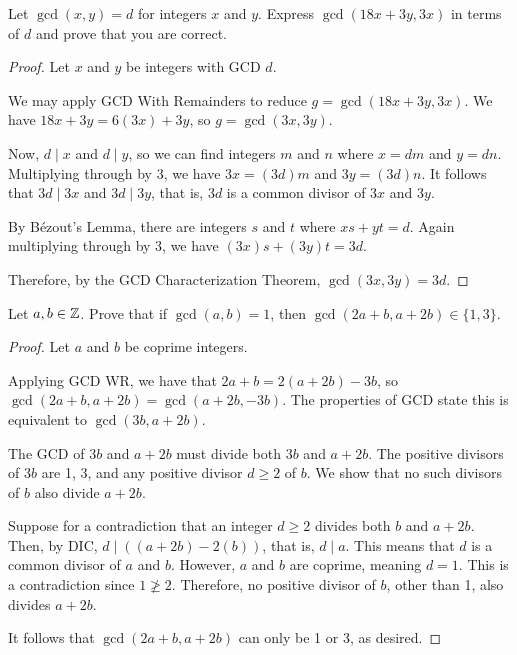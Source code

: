 \begin{recommended}
  Let $\gcd(x, y) = d$ for integers $x$ and $y$.
  Express $\gcd(18x + 3y, 3x)$ in terms of $d$ and prove that you are correct.
\end{recommended}
\begin{proof}
  Let $x$ and $y$ be integers with GCD $d$.

  We may apply GCD With Remainders to reduce $g=\gcd(18x+3y,3x)$.
  We have $18x+3y = 6(3x) + 3y$, so $g=\gcd(3x,3y)$.

  Now, $d \mid x$ and $d \mid y$, so we can find integers $m$ and $n$ where $x = dm$ and $y = dn$.
  Multiplying through by 3, we have $3x = (3d)m$ and $3y = (3d)n$.
  It follows that $3d \mid 3x$ and $3d \mid 3y$, that is, $3d$ is a common divisor of $3x$ and $3y$.

  By Bézout's Lemma, there are integers $s$ and $t$ where $xs+yt=d$.
  Again multiplying through by 3, we have $(3x)s+(3y)t=3d$.

  Therefore, by the GCD Characterization Theorem, $\gcd(3x,3y) = 3d$.
\end{proof}


\begin{recommended}
  Let $a,b\in\mathbb{Z}$. Prove that if $\gcd(a, b) = 1$, then $\gcd(2a+b, a+2b) \in \{1,3\}$.
\end{recommended}
\begin{proof}
  Let $a$ and $b$ be coprime integers.

  Applying GCD WR, we have that $2a+b = 2(a+2b)-3b$, so $\gcd(2a+b,a+2b)=\gcd(a+2b,-3b)$.
  The properties of GCD state this is equivalent to $\gcd(3b,a+2b)$.

  The GCD of $3b$ and $a+2b$ must divide both $3b$ and $a+2b$.
  The positive divisors of $3b$ are 1, 3, and any positive divisor $d \geq 2$ of $b$.
  We show that no such divisors of $b$ also divide $a+2b$.

  Suppose for a contradiction that an integer $d \geq 2$ divides both $b$ and $a+2b$.
  Then, by DIC, $d \mid ((a+2b)-2(b))$, that is, $d \mid a$.
  This means that $d$ is a common divisor of $a$ and $b$.
  However, $a$ and $b$ are coprime, meaning $d=1$.
  This is a contradiction since $1 \not\geq 2$.
  Therefore, no positive divisor of $b$, other than 1, also divides $a+2b$.

  It follows that $\gcd(2a+b,a+2b)$ can only be 1 or 3, as desired.
\end{proof}


